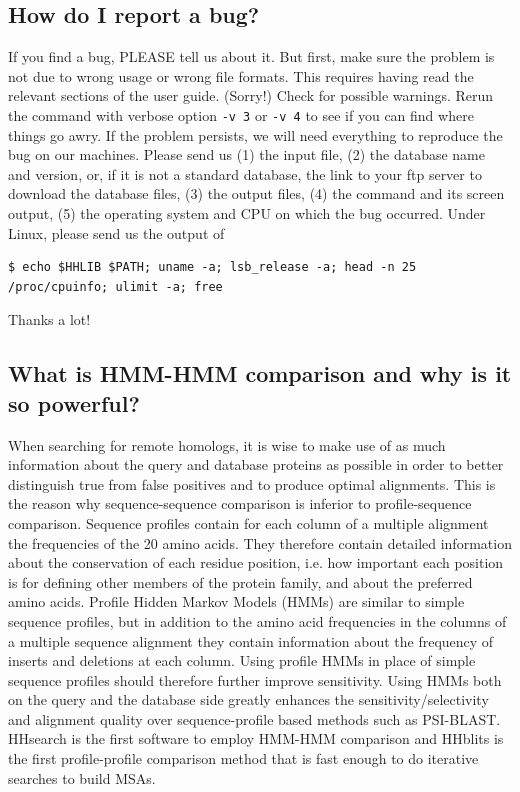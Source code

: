 \documentclass[11pt,a4paper]{article}
\begin{document}
\subsection{How do I report a bug?}
If you find a bug, PLEASE tell us about it. But first, make sure the problem is not due to wrong usage or wrong file formats. This requires having read the relevant sections of the user guide. (Sorry!) Check for possible warnings. Rerun the command with verbose option \verb`-v 3` or \verb`-v 4` to see if you can find where things go awry. If the problem persists, we will need everything to reproduce the bug on our machines. Please send us (1) the input file, (2) the database name and version, or, if it is not a standard database, the link to your ftp server to download the database files, (3) the output files, (4) the command and its screen output, (5) the operating system and CPU on which the bug occurred. Under Linux, please send us the output of 
\small
\begin{verbatim}
$ echo $HHLIB $PATH; uname -a; lsb_release -a; head -n 25 /proc/cpuinfo; ulimit -a; free
\end{verbatim}
\normalsize
Thanks a lot!

\subsection{What is HMM-HMM comparison and why is it so powerful?}
When searching for remote homologs, it is wise to make use of as much information about the query and database proteins as possible in order to better distinguish true from false positives and to produce optimal alignments. This is the reason why sequence-sequence comparison is inferior to profile-sequence comparison. Sequence profiles contain for each column of a multiple alignment the frequencies of the 20 amino acids. They therefore contain detailed information about the conservation of each residue position, i.e. how important each position is for defining other members of the protein family, and about the preferred amino acids. Profile Hidden Markov Models (HMMs) are similar to simple sequence profiles, but in addition to the amino acid frequencies in the columns of a multiple sequence alignment they contain information about the frequency of inserts and deletions at each column. Using profile HMMs in place of simple sequence profiles should therefore further improve sensitivity. Using HMMs both on the query and the database side greatly enhances the sensitivity/selectivity and alignment quality over sequence-profile based methods such as PSI-BLAST. HHsearch is the first software to employ HMM-HMM comparison and HHblits is the first profile-profile comparison method that is fast enough to do iterative searches to build MSAs. 
\end{document}
